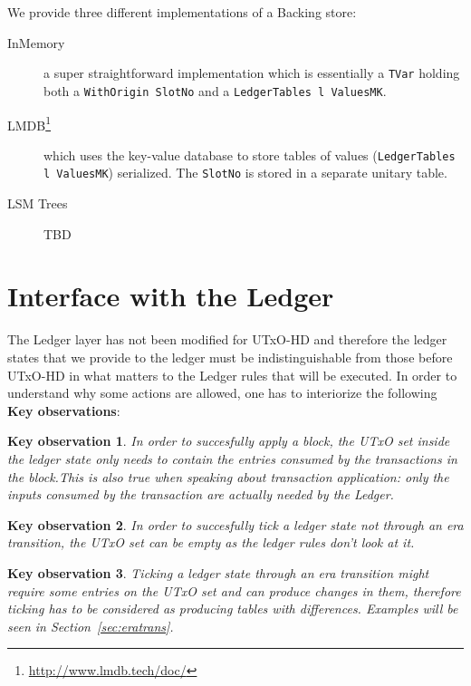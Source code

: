 \documentclass[11pt,a4paper]{article}
\newcommand{\htt}[1]{\texttt{#1}}
\theoremstyle{definition}
\newtheorem{observation}{Key observation}
\begin{document}
We provide three different implementations of a Backing store:

\begin{description}
  \item[InMemory] a super straightforward implementation which is
        essentially a \htt{TVar} holding both a \htt{WithOrigin SlotNo}
        and a \htt{LedgerTables l ValuesMK}.

  \item[LMDB\footnote{\href{http://www.lmdb.tech/doc/}{http://www.lmdb.tech/doc/}}] which uses the
        key-value database to store tables of values (\htt{LedgerTables
        l ValuesMK}) serialized. The \htt{SlotNo} is stored in a
        separate unitary table.

  \item[LSM Trees] TBD

\end{description}

\section{Interface with the Ledger}

The Ledger layer has not been modified for UTxO-HD and therefore the ledger
states that we provide to the ledger must be indistinguishable from those before
UTxO-HD in what matters to the Ledger rules that will be executed. In order to
understand why some actions are allowed, one has to interiorize the following
\textbf{Key observations}:

\begin{observation}
  \emph{In order to succesfully apply a block, the UTxO set inside the ledger state
  only needs to contain the entries consumed by the transactions in the block.This is also true when speaking about transaction application: only the inputs
  consumed by the transaction are actually needed by the Ledger.}
\end{observation}

\begin{observation}
  \emph{In order to succesfully tick a ledger state not through an era
    transition, the UTxO set can be empty as the ledger rules don't look at it.}
\end{observation}

\begin{observation}
  \emph{Ticking a ledger state through an era transition might require some
    entries on the UTxO set and can produce changes in them, therefore ticking
    has to be considered as producing tables with differences. Examples will be
    seen in Section~\ref{sec:eratrans}. }
\end{observation}
\end{document}
